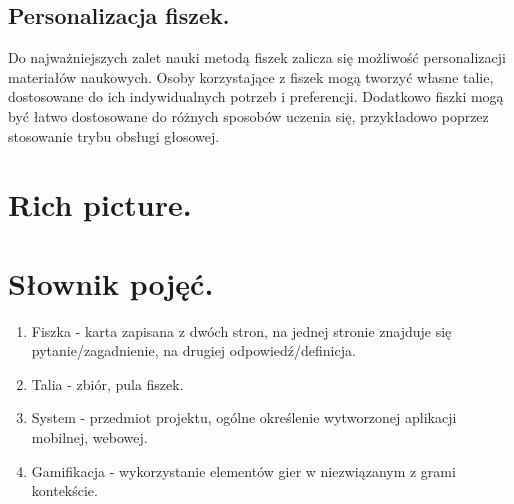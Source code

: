 \subsection{Personalizacja fiszek.}

Do najważniejszych zalet nauki metodą fiszek zalicza się możliwość personalizacji materiałów naukowych. Osoby korzystające z fiszek mogą tworzyć własne talie, dostosowane do ich indywidualnych potrzeb i preferencji. Dodatkowo fiszki mogą być łatwo dostosowane do różnych sposobów uczenia się, przykładowo poprzez stosowanie trybu obsługi głosowej.

\section{Rich picture.}


\section{Słownik pojęć.}

\begin{enumerate}
    \item Fiszka - karta zapisana z dwóch stron, na jednej stronie znajduje się pytanie/zagadnienie, na drugiej odpowiedź/definicja.
    \item Talia - zbiór, pula fiszek.
    \item System - przedmiot projektu, ogólne określenie wytworzonej aplikacji mobilnej, webowej.
    \item Gamifikacja - wykorzystanie elementów gier w niezwiązanym z grami kontekście.
    \end{enumerate}

\printbibliography
